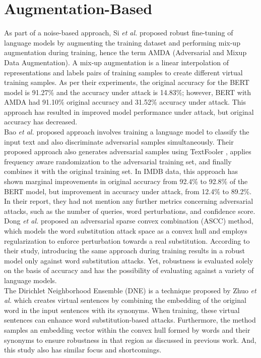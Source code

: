 \documentclass[%
	BCOR=8mm, %
	DIV=12,
	toc=bibliography, %
	toc=listof, %
	oneside, %
	egregdoesnotlikesansseriftitles, %
	]{scrbook}
\begin{document}
\section{Augmentation-Based}
As part of a noise-based approach, Si \textit{et al.} \cite{si_better_2021}  proposed robust fine-tuning of language models by augmenting the training dataset and performing mix-up augmentation during training, hence the term AMDA (Adversarial and Mixup Data Augmentation). A mix-up augmentation is a linear interpolation of representations and labels pairs of training samples to create different virtual training samples. As per their experiments, the original accuracy for the BERT model is 91.27\% and the accuracy under attack is 14.83\%; however, BERT with AMDA had 91.10\% original accuracy and 31.52\% accuracy under attack. This approach has resulted in improved model performance under attack, but original accuracy has decreased.\\
Bao \textit{et al.} \cite{bao_defending_2021} proposed approach involves training a language model to classify the input text and also discriminate adversarial samples simultaneously. Their proposed approach also generates adversarial samples using TextFooler \cite{jin_is_2020}, applies frequency aware randomization to the adversarial training set, and finally combines it with the original training set. In IMDB data, this approach has shown marginal improvements in original accuracy from 92.4\% to 92.8\% of the BERT model, but improvement in accuracy under attack, from 12.4\% to 89.2\%. In their report, they had not mention any further metrics concerning adversarial attacks, such as the number of queries, word perturbations, and confidence score.\\
Dong \textit{et al. }\cite{dong_towards_2021-2} proposed an adversarial sparse convex combination (ASCC) method, which models the word substitution attack space as a convex hull and employs regularization to enforce perturbation towards a real substitution. According to their study, introducing the same approach during training results in a robust model only against word substitution attacks. Yet, robustness is evaluated solely on the basis of accuracy and has the possibility of evaluating against a variety of language models. \\
The Dirichlet Neighborhood Ensemble (DNE) is a technique proposed by Zhuo \textit{et al.} \cite{zhou_defense_2020} which creates virtual sentences by combining the embedding of the original word in the input sentences with its synonyms. When training, these virtual sentences can enhance word substitution-based attacks. Furthermore,  the method samples an embedding vector within the convex hull formed by words  and their synonyms to ensure robustness in that region as discussed in previous work. And, this study also has similar focus and shortcomings.\\
\end{document}
